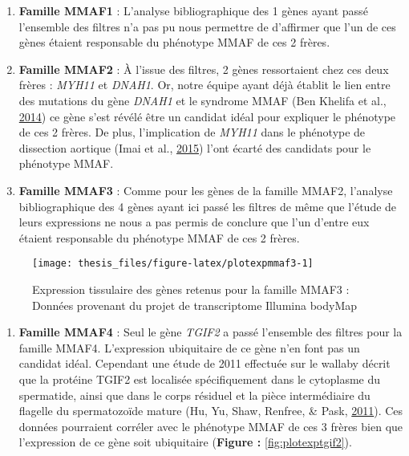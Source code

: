\documentclass[12pt,twoside]{reedthesis}
\providecommand{\tightlist}{%
  \setlength{\itemsep}{0pt}\setlength{\parskip}{0pt}}
\theoremstyle{definition}
\theoremstyle{definition}
\theoremstyle{remark}
\begin{document}
  \begin{enumerate}
  \def\labelenumi{\arabic{enumi}.}
  \setcounter{enumi}{2}
  \tightlist
  \item
    \textbf{Famille MMAF1} : L'analyse bibliographique des 1 gènes ayant
    passé l'ensemble des filtres n'a pas pu nous permettre de d'affirmer
    que l'un de ces gènes étaient responsable du phénotype MMAF de ces 2
    frères.\\
  \item
    \textbf{Famille MMAF2} : À l'issue des filtres, 2 gènes ressortaient
    chez ces deux frères : \emph{MYH11} et \emph{DNAH1}. Or, notre équipe
    ayant déjà établit le lien entre des mutations du gène \emph{DNAH1} et
    le syndrome MMAF (Ben Khelifa et al.,
    \protect\hyperlink{ref-BenKhelifa2014}{2014}) ce gène s'est révélé
    être un candidat idéal pour expliquer le phénotype de ces 2 frères. De
    plus, l'implication de \emph{MYH11} dans le phénotype de dissection
    aortique (Imai et al., \protect\hyperlink{ref-Imai2015}{2015}) l'ont
    écarté des candidats pour le phénotype MMAF.\\
  \item
    \textbf{Famille MMAF3} : Comme pour les gènes de la famille MMAF2,
    l'analyse bibliographique des 4 gènes ayant ici passé les filtres de
    même que l'étude de leurs expressions ne nous a pas permis de conclure
    que l'un d'entre eux étaient responsable du phénotype MMAF de ces 2
    frères. \newpage
  \end{enumerate}
  
  \begin{figure}
  
  {\centering \texttt{[image: thesis\_files/figure-latex/plotexpmmaf3-1]} 
  
  }
  
  \caption[Expression tissulaire des gènes retenus pour la famille MMAF3]{Expression tissulaire des gènes retenus pour la famille MMAF3 : Données provenant du projet de transcriptome Illumina bodyMap}\label{fig:plotexpmmaf3}
  \end{figure}
  
  \begin{enumerate}
  \def\labelenumi{\arabic{enumi}.}
  \setcounter{enumi}{5}
  \tightlist
  \item
    \textbf{Famille MMAF4} : Seul le gène \emph{TGIF2} a passé l'ensemble
    des filtres pour la famille MMAF4. L'expression ubiquitaire de ce gène
    n'en font pas un candidat idéal. Cependant une étude de 2011 effectuée
    sur le wallaby décrit que la protéine TGIF2 est localisée
    spécifiquement dans le cytoplasme du spermatide, ainsi que dans le
    corps résiduel et la pièce intermédiaire du flagelle du spermatozoïde
    mature (Hu, Yu, Shaw, Renfree, \& Pask,
    \protect\hyperlink{ref-Hu2011}{2011}). Ces données pourraient corréler
    avec le phénotype MMAF de ces 3 frères bien que l'expression de ce
    gène soit ubiquitaire (\textbf{Figure : }\ref{fig:plotexptgif2}).
  \end{enumerate}
  
\end{document}

